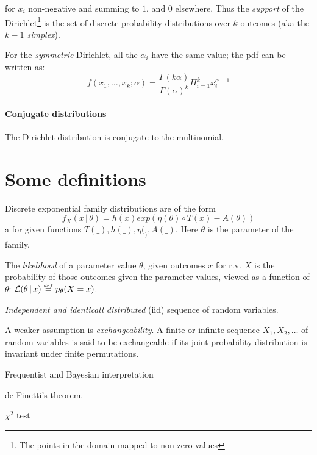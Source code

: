 \documentclass{article}
\newcommand{\alt}{\,|\,}
\newcommand{\defeq}{\stackrel{{\scriptscriptstyle def}}{=}}
\begin{document}
for $x_i$ non-negative and summing to $1$, and $0$ elsewhere. Thus the {\em support} of the Dirichlet\footnote{The points in the domain mapped to non-zero values} is the set of discrete probability distributions over $k$ outcomes (aka the {\em $k-1$ simplex}).

For the {\em symmetric} Dirichlet, all the $\alpha_i$ have the same value; the pdf can be written as:
$$f(x_1, \ldots, x_k; \alpha) = \frac{\Gamma(k\alpha)}{\Gamma(\alpha)^k} \Pi_{i=1}^k x_i^{\alpha -1}$$

\paragraph{Conjugate distributions}

The Dirichlet distribution is conjugate to the multinomial.


\appendix

\section{Some definitions}

Discrete exponential family distributions are of the form
$$f_X(x \alt \theta) = h(x) exp(\eta(\theta) \circ T(x) - A(\theta))$$a
for given functions $T(\_), h(\_), \eta(_), A(\_)$. Here $\theta$ is the parameter of the family.

The {\em likelihood} of a parameter value $\theta$, given outcomes $x$ for r.v. $X$ is the probability of those outcomes given the parameter values, viewed as a function of $\theta$:
${\cal L}(\theta \alt x) \defeq p_{\theta}(X=x)$. 

{\em Independent and identicall distributed} (iid) sequence of random variables.

A weaker assumption is {\em exchangeability}. A finite or infinite sequence $X_1, X_2, \ldots$ of random variables is said to be exchangeable if its joint probability distribution is invariant under finite permutations.

Frequentist and Bayesian interpretation

de Finetti's theorem.


$\chi^2$ test
\end{document}
